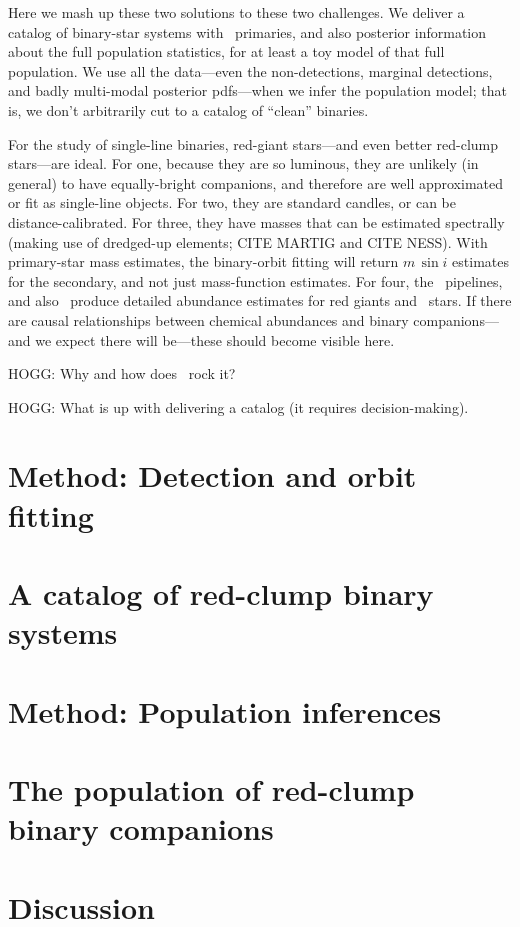 \documentclass[modern, letterpaper]{aastex61}
\newcommand{\apogee}{\project{\acronym{APOGEE}}}
\newcommand{\thecannon}{\project{The~Cannon}}
\newcommand{\RC}{\acronym{RC}}
\begin{document}
Here we mash up these two solutions to these two challenges.
We deliver a catalog of binary-star systems with \RC\ primaries, and also
posterior information about the full population statistics, for at least
a toy model of that full population.
We use all the data---even the non-detections, marginal detections, and
badly multi-modal posterior pdfs---when we infer the population model;
that is, we don't arbitrarily cut to a catalog of ``clean'' binaries.

For the study of single-line binaries, red-giant stars---and even
better red-clump stars---are ideal.
For one, because they are so luminous, they are unlikely (in general)
to have equally-bright companions, and therefore are well approximated
or fit as single-line objects.
For two, they are standard candles, or can be distance-calibrated.
For three, they have masses that can be estimated spectrally (making
use of dredged-up elements; CITE MARTIG and CITE NESS).
With primary-star mass estimates, the binary-orbit fitting will return
$m\,\sin i$ estimates for the secondary, and not just mass-function
estimates.
For four, the \apogee\ pipelines, and also \thecannon\, produce
detailed abundance estimates for red giants and \RC\ stars.
If there are causal relationships between chemical abundances and
binary companions---and we expect there will be---these should become
visible here.

HOGG: Why and how does \apogee\ rock it?

HOGG: What is up with delivering a catalog (it requires decision-making).

\section{Method: Detection and orbit fitting}

\section{A catalog of red-clump binary systems}

\section{Method: Population inferences}

\section{The population of red-clump binary companions}

\section{Discussion}
\end{document}
